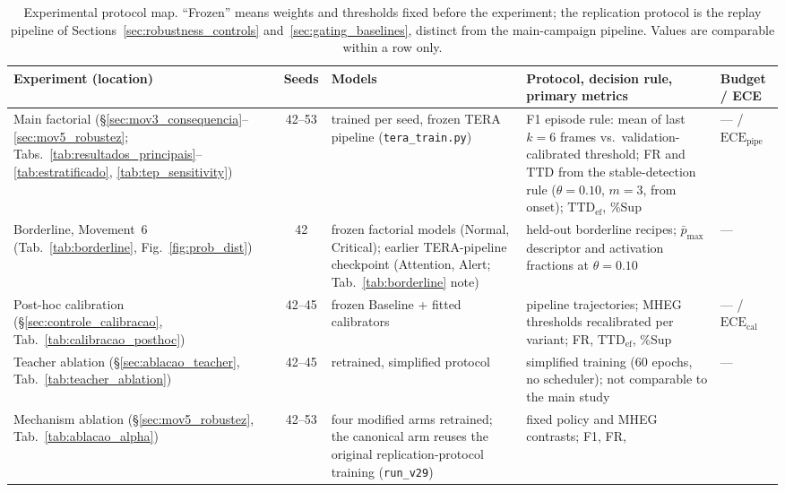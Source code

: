 \documentclass[a4paper,fleqn]{cas-dc}
\newcommand{\MHEG}{\mbox{MHEG}\xspace}
\begin{document}
\begin{table}[!tbp]
\color{\revcolor}
\centering
\caption{Experimental protocol map. ``Frozen'' means weights and thresholds
fixed before the experiment; the replication protocol is the replay pipeline
of Sections~\ref{sec:robustness_controls} and~\ref{sec:gating_baselines},
distinct from the main-campaign pipeline. Values are comparable within a row
only.}
\label{tab:protocol_map}
\scriptsize
\setlength{\tabcolsep}{2.8pt}
\renewcommand{\arraystretch}{1.18}
\begin{tabularx}{\textwidth}{>{\raggedright\arraybackslash}p{2.7cm}
  c >{\raggedright\arraybackslash}p{3.0cm} >{\raggedright\arraybackslash}X
  >{\raggedright\arraybackslash}p{2.4cm}}
\toprule
\textbf{Experiment (location)} & \textbf{Seeds} & \textbf{Models}
  & \textbf{Protocol, decision rule, primary metrics}
  & \textbf{Budget / ECE} \\
\midrule
Main factorial (\S\ref{sec:mov3_consequencia}--\ref{sec:mov5_robustez};
Tabs.~\ref{tab:resultados_principais}--\ref{tab:estratificado},
\ref{tab:tep_sensitivity}) & 42--53 & trained per seed, frozen TERA pipeline (\texttt{tera\_train.py})
  & F1 episode rule: mean of last $k{=}6$ frames vs.\ validation-calibrated
    threshold; FR and $\mathrm{TTD}$ from the stable-detection rule
    ($\theta{=}0.10$, $m{=}3$, from onset); $\mathrm{TTD}_{\mathrm{ef}}$, \%Sup
  & --- / $\mathrm{ECE}_{\mathrm{pipe}}$ \\
Borderline, Movement~6 (Tab.~\ref{tab:borderline},
Fig.~\ref{fig:prob_dist}) & 42 & {\color{\revcolor}frozen factorial models (Normal, Critical); earlier TERA-pipeline checkpoint (Attention, Alert; Tab.~\ref{tab:borderline} note)}
  & held-out borderline recipes; $\bar{p}_{\max}$ descriptor and activation
    fractions at $\theta{=}0.10$ & --- \\
Post-hoc calibration (\S\ref{sec:controle_calibracao},
Tab.~\ref{tab:calibracao_posthoc}) & 42--45 & frozen Baseline + fitted
  calibrators & pipeline trajectories; \MHEG thresholds recalibrated per
  variant; FR, $\mathrm{TTD}_{\mathrm{ef}}$, \%Sup
  & --- / $\mathrm{ECE}_{\mathrm{cal}}$ \\
Teacher ablation (\S\ref{sec:ablacao_teacher},
Tab.~\ref{tab:teacher_ablation}) & 42--45 & retrained, simplified protocol
  & simplified training (60 epochs, no scheduler); not comparable to the main
    study & --- \\
Mechanism ablation (\S\ref{sec:mov5_robustez},
Tab.~\ref{tab:ablacao_alpha}) & 42--53 & four modified arms retrained; the
  canonical arm reuses the original replication-protocol training (\texttt{run\_v29}) & fixed policy and \MHEG contrasts; F1, FR,

\end{tabularx}
\end{table}
\end{document}
